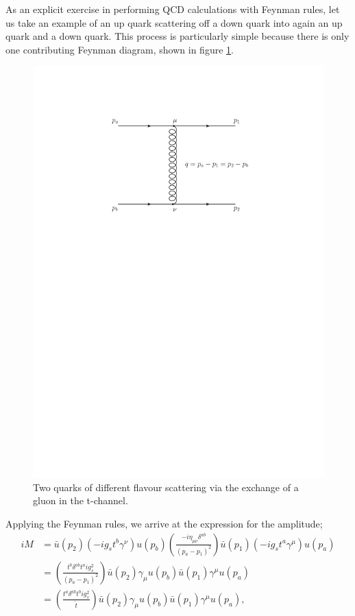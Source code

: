 As an explicit exercise in performing QCD calculations with Feynman rules, let us take an example of an up quark scattering off a down quark into again an up quark and a down quark. This process is particularly simple because there is only one contributing Feynman diagram, shown in figure \ref{fig:qQqQ}.

\begin{figure}[t]
\centering
\includegraphics[scale=0.75]{Images/qQ_t.pdf} 
\caption{Two quarks of different flavour scattering via the exchange of a gluon in the t-channel.}
\label{fig:qQqQ}
\end{figure}

Applying the Feynman rules, we arrive at the expression for the amplitude;
\begin{equation}
\begin{split}
iM &= \bar{u}(p_2) (-i g_s t^b \gamma^\nu)u(p_b) \left(\frac{-i \eta_{\mu \nu} \delta^{ab}}{(p_a-p_1)^2} \right)\bar{u}(p_1)(-i g_s t^a \gamma^\mu) u(p_a) \\
&= \left(\frac{t^b \delta^{ab} t^a i g_s^2 }{(p_a-p_1)^2}\right) \bar{u}(p_2) \gamma_\mu u(p_b) \bar{u}(p_1)\gamma^\mu u(p_a) \\
&= \left(\frac{t^a \delta^{ab} t^b i g_s^2 }{\hat{t}}\right) \bar{u}(p_2) \gamma_\mu u(p_b) \bar{u}(p_1)\gamma^\mu u(p_a),
\end{split}
\end{equation}

